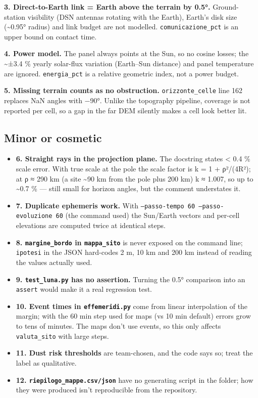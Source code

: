 \documentclass[11pt,a4paper]{article}
\providecommand{\tightlist}{\setlength{\itemsep}{0pt}\setlength{\parskip}{0pt}}
\begin{document}
\textbf{3. Direct-to-Earth link = Earth above the terrain by 0.5°.}
Ground-station visibility (DSN antennas rotating with the Earth),
Earth's disk size (\textasciitilde0.95° radius) and link budget are not
modelled. \texttt{comunicazione\_pct} is an upper bound
on contact time.

\textbf{4. Power model.} The panel always points at the Sun, so no
cosine losses; the \textasciitilde±3.4 \% yearly solar-flux variation
(Earth--Sun distance) and panel temperature are ignored.
\texttt{energia\_pct} is a relative geometric index,
not a power budget.

\textbf{5. Missing terrain counts as no obstruction.}
\texttt{orizzonte\_celle} line 162 replaces NaN angles
with −90°. Unlike the topography pipeline, coverage is not reported per
cell, so a gap in the far DEM silently makes a cell look better lit.

\hypertarget{minor-or-cosmetic}{%
\subsection{Minor or cosmetic}\label{minor-or-cosmetic}}

\begin{itemize}
\tightlist
\item
  \textbf{6. Straight rays in the projection plane.} The docstring
  states \textless{} 0.4 \% scale error. With true scale at the pole the
  scale factor is k = 1 + ρ²/(4R²); at ρ ≈ 290 km (a site
  \textasciitilde90 km from the pole plus 200 km) k ≈ 1.007, so up to
  \textasciitilde0.7 \% --- still small for horizon angles, but the
  comment understates it.
\item
  \textbf{7. Duplicate ephemeris work.} With
  \texttt{--passo-tempo 60 --passo-evoluzione 60} (the
  command used) the Sun/Earth vectors and per-cell elevations are
  computed twice at identical steps.
\item
  \textbf{8. \texttt{margine\_bordo} in
  \texttt{mappa\_sito}} is never exposed on the command
  line; \texttt{ipotesi} in the JSON hard-codes 2 m, 10
  km and 200 km instead of reading the values actually used.
\item
  \textbf{9. \texttt{test\_luna.py} has no assertion.}
  Turning the 0.5° comparison into an \texttt{assert}
  would make it a real regression test.
\item
  \textbf{10. Event times in \texttt{effemeridi.py}}
  come from linear interpolation of the margin; with the 60 min step
  used for maps (vs 10 min default) errors grow to tens of minutes. The
  maps don't use events, so this only affects
  \texttt{valuta\_sito} with large steps.
\item
  \textbf{11. Dust risk thresholds} are team-chosen, and the code says
  so; treat the label as qualitative.
\item
  \textbf{12. \texttt{riepilogo\_mappe.csv/json}} have
  no generating script in the folder; how they were produced isn't
  reproducible from the repository.
\end{itemize}
\end{document}
